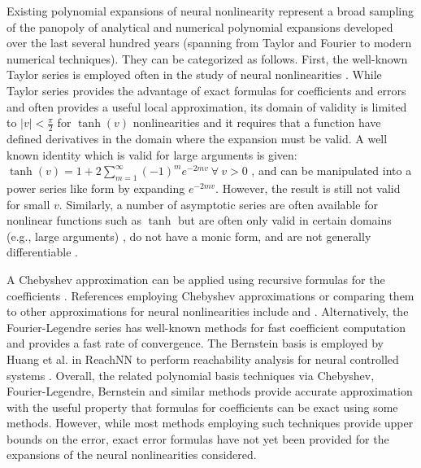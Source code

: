Existing polynomial expansions of neural nonlinearity represent a broad sampling of the panopoly of analytical and numerical polynomial expansions developed over the last several hundred years (spanning from Taylor and Fourier to modern numerical techniques).  They can be categorized as follows.  First, the well-known Taylor series is employed often in the study of neural nonlinearities \cite{engelbrecht_using_2000,xiaoyun_new_neural_nets_2009,balduzzi_neural_2017,montavon_explaining_2017,guo_novel_2017,gaikwad_pruning_2018}.  While Taylor series provides the advantage of exact formulas for coefficients and errors and often provides a useful local approximation, its domain of validity is limited to $|v| < \frac{\pi}{2}$ for $\tanh(v)$ nonlinearities \cite{bateman_higher_1953} and it requires that a function have defined derivatives in the domain where the expansion must be valid.  A well known identity which is valid for large arguments is given: $\tanh(v) = 1 + 2\sum_{m=1}^{\infty}(-1)^m e^{-2 m v}\ \forall\ v > 0$ \cite{gradshtein_table_2007}, and can be manipulated into a power series like form by expanding $e^{-2 m v}$. However, the result is still not valid for small $v$.  Similarly, a number of asymptotic series are often available for nonlinear functions such as $\tanh$ but are often only valid in certain domains (e.g., large arguments)  \cite{noauthor_hyperbolic_nodate}, do not have a monic form, and are not generally differentiable \cite{gradshtein_table_2007}.

A Chebyshev approximation can be applied using recursive formulas for the coefficients \cite{vlcek_chebyshev_2012}.  References employing Chebyshev approximations or comparing them to other approximations for neural nonlinearities include \cite{aboulatta_stabilizing_2019, lee_near-optimal_2020} and \cite{obla_effective_2020}.  Alternatively, the Fourier-Legendre series \cite{bojanic_rate_1981} has well-known methods for fast coefficient computation \cite{alpert_fast_1991} and provides a fast rate of convergence.  The Bernstein basis is employed by Huang et al. in ReachNN to perform reachability analysis for neural controlled systems \cite{huang_reachnn:_2019}.  Overall, the related polynomial basis techniques via Chebyshev, Fourier-Legendre, Bernstein and similar methods provide accurate approximation with the useful property that formulas for coefficients can be exact using some methods.  However, while most methods employing such techniques provide upper bounds on the error, exact error formulas have not yet been provided for the expansions of the neural nonlinearities considered.

